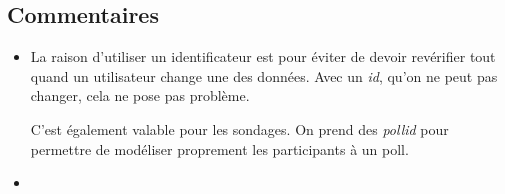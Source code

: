 \documentclass{article}
\begin{document}
\subsection{Commentaires}

    \begin{itemize}
        \item La raison d'utiliser un identificateur est pour éviter de devoir revérifier tout quand un utilisateur change une des données. Avec un \textit{id}, qu'on ne peut pas changer, cela ne pose pas problème.

        C'est également valable pour les sondages. On prend des \textit{pollid} pour permettre de modéliser proprement les participants à un poll.
        \item
    \end{itemize}
\end{document}
